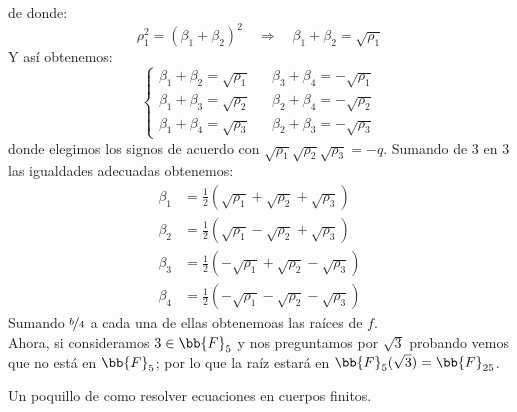 de donde:
\begin{equation*}
    \rho_1^2 = {(\beta_1+\beta_2)}^{2} \quad\Longrightarrow\quad\beta_1+\beta_2 = \sqrt{\rho_1}
\end{equation*}
Y así obtenemos:
\begin{equation*}
    \left\{\begin{array}{lll}
        \beta_1 + \beta_2 = \sqrt{\rho_1} && \beta_3 + \beta_4 = -\sqrt{\rho_1} \\
        \beta_1 + \beta_3 = \sqrt{\rho_2} && \beta_2 + \beta_4 = -\sqrt{\rho_2} \\
        \beta_1 + \beta_4 = \sqrt{\rho_3} && \beta_2 + \beta_3 = -\sqrt{\rho_3} 
    \end{array}\right.
\end{equation*}
donde elegimos los signos de acuerdo con $\sqrt{\rho_1}\sqrt{\rho_2}\sqrt{\rho_3} = -q$. Sumando de 3 en 3 las igualdades adecuadas obtenemos:
\begin{align*}
    \beta_1 &= \frac{1}{2}(\sqrt{\rho_1} + \sqrt{\rho_2} + \sqrt{\rho_3}) \\
    \beta_2 &= \frac{1}{2}(\sqrt{\rho_1} - \sqrt{\rho_2} + \sqrt{\rho_3}) \\
    \beta_3 &= \frac{1}{2}(-\sqrt{\rho_1} + \sqrt{\rho_2} - \sqrt{\rho_3}) \\
    \beta_4 &= \frac{1}{2}(-\sqrt{\rho_1} - \sqrt{\rho_2} - \sqrt{\rho_3}) 
\end{align*}
Sumando $\nicefrac{b}{4}$ a cada una de ellas obtenemoas las raíces de $f$.\\

\noindent
Ahora, si consideramos $3\in \bb{F}_5$ y nos preguntamos por $\sqrt{3}$ probando vemos que no está en $\bb{F}_5$; por lo que la raíz estará en $\bb{F}_5(\sqrt{3}) = \bb{F}_{25}$.

\noindent
Un poquillo de como resolver ecuaciones en cuerpos finitos.\\


